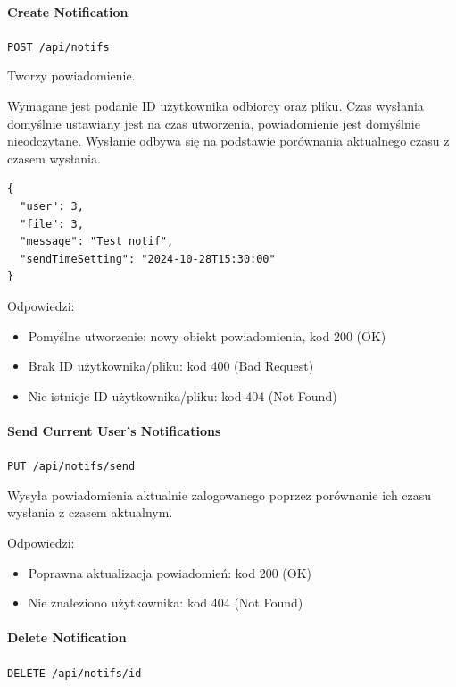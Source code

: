 \documentclass[a4paper,twoside,12pt]{book}
\begin{document}
\paragraph{Create Notification}\label{create-notification}

\texttt{POST /api/notifs}

Tworzy powiadomienie.

Wymagane jest podanie ID użytkownika odbiorcy oraz pliku. Czas wysłania domyślnie ustawiany jest na czas utworzenia, powiadomienie jest domyślnie nieodczytane. Wysłanie odbywa się na podstawie porównania aktualnego czasu z czasem wysłania.

\begin{verbatim}
{
  "user": 3,
  "file": 3,
  "message": "Test notif",
  "sendTimeSetting": "2024-10-28T15:30:00"
}
\end{verbatim}

Odpowiedzi: 
\begin{itemize}
	\item Pomyślne utworzenie: nowy obiekt powiadomienia, kod 200 (OK) 
	\item Brak ID użytkownika/pliku: kod 400 (Bad Request) 
	\item Nie istnieje ID użytkownika/pliku: kod 404 (Not Found)
\end{itemize}

\paragraph{Send Current User's Notifications}\label{send-current-users-notifications}

\texttt{PUT /api/notifs/send}

Wysyła powiadomienia aktualnie zalogowanego poprzez porównanie ich czasu wysłania z czasem aktualnym.

Odpowiedzi: 
\begin{itemize}
	\item Poprawna aktualizacja powiadomień: kod 200 (OK) 
	\item Nie znaleziono użytkownika: kod 404 (Not Found)
\end{itemize}

\paragraph{Delete Notification}\label{delete-notification}

\texttt{DELETE /api/notifs/{id}}
\end{document}
